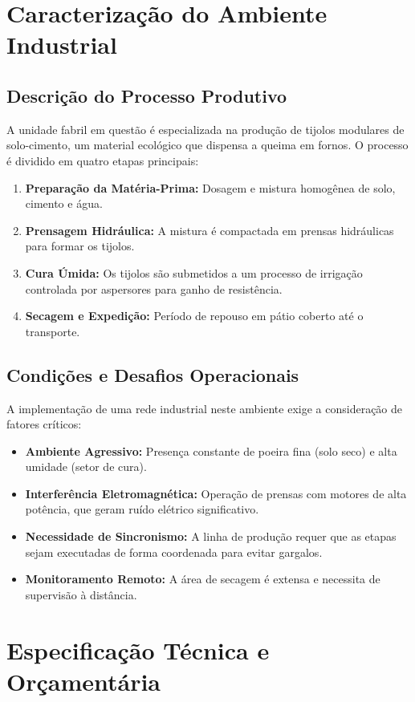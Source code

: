 \documentclass[12pt,a4paper]{article}
\begin{document}
\section{Caracterização do Ambiente Industrial}

\subsection{Descrição do Processo Produtivo}
A unidade fabril em questão é especializada na produção de tijolos modulares de solo-cimento, um material ecológico que dispensa a queima em fornos. O processo é dividido em quatro etapas principais:
\begin{enumerate}
    \item \textbf{Preparação da Matéria-Prima:} Dosagem e mistura homogênea de solo, cimento e água.
    \item \textbf{Prensagem Hidráulica:} A mistura é compactada em prensas hidráulicas para formar os tijolos.
    \item \textbf{Cura Úmida:} Os tijolos são submetidos a um processo de irrigação controlada por aspersores para ganho de resistência.
    \item \textbf{Secagem e Expedição:} Período de repouso em pátio coberto até o transporte.
\end{enumerate}

\subsection{Condições e Desafios Operacionais}
A implementação de uma rede industrial neste ambiente exige a consideração de fatores críticos:
\begin{itemize}
    \item \textbf{Ambiente Agressivo:} Presença constante de poeira fina (solo seco) e alta umidade (setor de cura).
    \item \textbf{Interferência Eletromagnética:} Operação de prensas com motores de alta potência, que geram ruído elétrico significativo.
    \item \textbf{Necessidade de Sincronismo:} A linha de produção requer que as etapas sejam executadas de forma coordenada para evitar gargalos.
    \item \textbf{Monitoramento Remoto:} A área de secagem é extensa e necessita de supervisão à distância.
\end{itemize}

\section{Especificação Técnica e Orçamentária}
\end{document}
